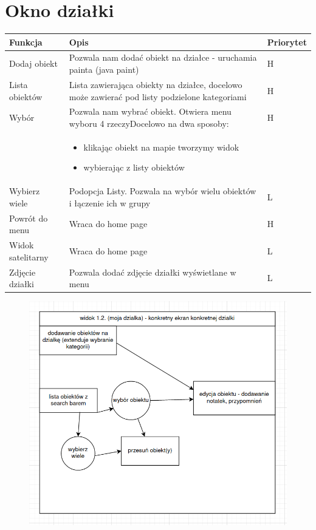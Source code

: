 \newpage
\section{Okno działki}

\begin{table}[H]
    \begin{center}
    \label{tab:table}
    \begin{tabularx}{1.1\textwidth} { 
    >{\raggedright\arraybackslash}X 
    | >{\raggedright\arraybackslash}X 
    | >{\raggedleft\arraybackslash}X}
    \textbf{Funkcja} & \textbf{Opis} & \textbf{Priorytet}\\
    \hline
    Dodaj obiekt&Pozwala nam dodać obiekt na działce - uruchamia painta (java paint)&H\\
    \hline
    Lista obiektów&Lista zawierająca obiekty na działce, docelowo może zawierać pod listy podzielone kategoriami&H\\
    \hline
    Wybór&Pozwala nam wybrać obiekt. Otwiera menu wyboru 4 rzeczyDocelowo na dwa sposoby: &H\\
    &\begin{itemize}
    \item klikając obiekt na mapie tworzymy widok
  	\item wybierając z listy obiektów
	\end{itemize}&\\
	\hline
    Wybierz wiele&Podopcja Listy. Pozwala na wybór wielu obiektów i łączenie ich w grupy&L\\
    \hline
    Powrót do menu&Wraca do home page&H\\
    \hline
    Widok satelitarny&Wraca do home page&L\\
    \hline
    Zdjęcie działki&Pozwala dodać zdjęcie działki wyświetlane w menu&L\\
    \hline

    \end{tabularx}
    \end{center}
    \end{table}
    \begin{figure}[htp]
      \centering
      \includegraphics[width=15cm]{ciba10.png}
  \end{figure}    
  